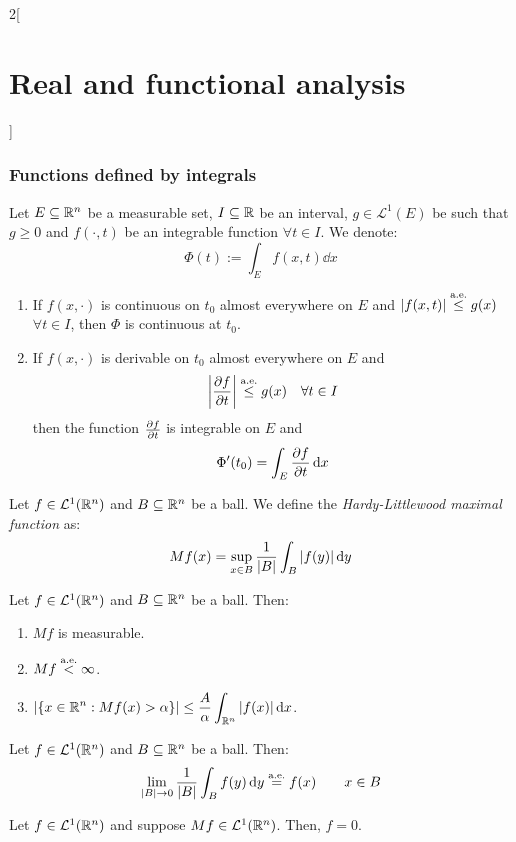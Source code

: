 \documentclass[../../../main_math.tex]{subfiles}
\begin{document}
\begin{multicols}{2}[\section{Real and functional analysis}]
  \subsubsection{Functions defined by integrals}
  \begin{theorem}\label{RFA:diffUnderIntegralSign}
    Let $E\subseteq\mathbb{R}^n$ be a measurable set, $I\subseteq \mathbb{R}$ be an interval, $g\in \mathcal{L}^1(E)$ be such that $g\geq 0$ and $f(\cdot, t)$ be an integrable function $\forall t\in I$. We denote: $$\Phi(t):=\int_Ef(x,t)\dd{x}$$
    \begin{enumerate}
      \item If $f(x,\cdot)$ is continuous on $t_0$ almost everywhere on $E$ and $\abs{f(x,t)}\overset{\text{a.e.}}{\leq} g(x)$ $\forall t\in I$, then $\Phi$ is continuous at $t_0$.
      \item If $f(x,\cdot)$ is derivable on $t_0$ almost everywhere on $E$ and $$\abs{\pdv{f}{t}(x,t)}\overset{\text{a.e.}}{\leq} g(x)\quad\forall t\in I$$ then the function $\pdv{f}{t}(x,\cdot)$ is integrable on $E$ and $$\Phi'(t_0)=\int_E\pdv{f}{t}(x,t_0)\dd{x}$$
    \end{enumerate}
  \end{theorem}
  \begin{definition}
    Let $f\in \mathcal{L}^1(\mathbb{R}^n)$ and $B\subseteq \mathbb{R}^n$ be a ball. We define the \emph{Hardy-Littlewood maximal function} as: $$Mf(x)=\sup_{x\in B}\frac{1}{\m{B}}\int_B\abs{f(y)}\dd{y}$$
  \end{definition}
  \begin{theorem}
    Let $f\in \mathcal{L}^1(\mathbb{R}^n)$ and $B\subseteq \mathbb{R}^n$ be a ball. Then:
    \begin{enumerate}
      \item $Mf$ is measurable.
      \item $Mf\overset{\text{a.e.}}{<}\infty$.
      \item $\displaystyle\m{\{x\in\RR^n : Mf(x) > \alpha\}} \leq \frac{A}{\alpha}\int_{\RR^n} \abs{f(x)}\dd{x}$.
    \end{enumerate}
  \end{theorem}
  \begin{theorem}
    Let $f\in \mathcal{L}^1(\mathbb{R}^n)$ and $B\subseteq \mathbb{R}^n$ be a ball. Then: $$\lim_{\m{B}\to 0}\frac{1}{\m{B}}\int_Bf(y)\dd{y} \almoste{=} f(x) \qquad x\in  B$$
  \end{theorem}
  \begin{proposition}
    Let $f\in \mathcal{L}^1(\mathbb{R}^n)$ and suppose $Mf\in \mathcal{L}^1(\mathbb{R}^n)$. Then, $f=0$.
  \end{proposition}

\end{multicols}
\end{document}
